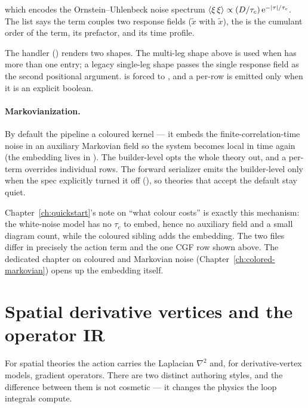 which encodes the Ornstein--Uhlenbeck noise spectrum
$\left\langle \xi\,\xi \right\rangle \propto (D/\tau_c)\,\mathrm{e}^{-|\tau|/\tau_c}$. The 
list says the term couples two response fields ($\tilde x$ with $\tilde x$), the
 is the cumulant order of the term,  its prefactor,
and  its time profile.

The handler  ()
renders two shapes. The multi-leg shape above is used when 
has more than one entry; a legacy single-leg shape
 passes the single
response field as the second positional argument.  is forced to
, and a per-row  is emitted only when it is an
explicit boolean.

\paragraph{Markovianization.} By default the pipeline  a
coloured kernel --- it embeds the finite-correlation-time noise in an auxiliary
Markovian field so the system becomes local in time again (the embedding lives in
). The builder-level
 opts the whole theory out, and a per-term
 overrides individual rows. The forward serializer
emits the builder-level  only when the spec explicitly
turned it off (), so theories that
accept the default stay quiet.

\begin{note}
Chapter~\ref{ch:quickstart}'s note on ``what colour costs'' is exactly this
mechanism: the white-noise model has no $\tau_c$ to embed, hence no auxiliary
field and a small diagram count, while the coloured sibling adds the embedding.
The two files differ in precisely the action term and the one CGF row shown
above. The dedicated chapter on coloured and Markovian noise
(Chapter~\ref{ch:colored-markovian}) opens up the embedding itself.
\end{note}

\section{Spatial derivative vertices and the operator IR}\label{sec:tf-spatial}

For spatial theories the action carries the Laplacian $\nabla^{2}$ and, for
derivative-vertex models, gradient operators. There are two distinct authoring
styles, and the difference between them is not cosmetic --- it changes the physics
the loop integrals compute.

